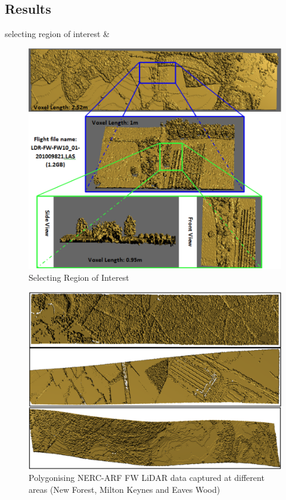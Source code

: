 \documentclass{subfiles}
\begin{document}
\subsection{Results}

 
 selecting region of interest \&
 

 \begin{figure} [h!]
 	\centering
 	\includegraphics[width=.8\textwidth]{img/SelectingRegionOfInterest}
 	\caption[Selecting Region of Interest]{Selecting Region of Interest}
 	\label{fig:SelectingRegionOfInterest}
 \end{figure}
 
 
  \begin{figure} [h!]
  	\centering
  	\includegraphics[width=.8\textwidth]{img/VariousFlightlines}
  	\caption[Various Flightlines Visualisation]{Polygonising NERC-ARF FW LiDAR data captured at different areas (New Forest, Milton Keynes and Eaves Wood)}
  	\label{fig:VariousFlightlines}
  \end{figure}
  
\end{document}
